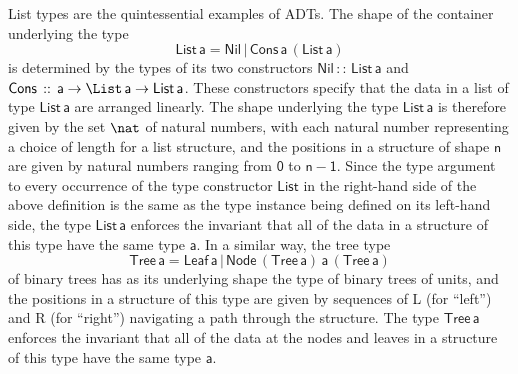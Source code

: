 \documentclass[submission,copyright,creativecommons]{eptcs}
\begin{document}
List types are the quintessential examples of ADTs. The shape of the
container underlying the
type
\[\mathsf{List\,a} = \mathsf{Nil} \,|\, \mathsf{Cons\,a\,(List\,a)}\]
is determined by the types of its two constructors $\mathsf{Nil\, ::\,
  List\, a}$ and $\mathsf{Cons \,::\,a \to \List\,a\to
  List\,a}$. These constructors specify that the data in a list of
type $\mathsf{List\,a}$ are arranged linearly. The shape underlying
the type $\mathsf{List\,a}$ is therefore given by the set $\nat$ of
natural numbers, with each natural number representing a choice of
length for a list structure, and the positions in a structure of shape
$\mathsf{n}$ are given by natural numbers ranging from $\mathsf{0}$ to
$\mathsf{n-1}$. Since the type argument to every occurrence of the
type constructor $\mathsf{List}$ in the right-hand side of the above
definition is the same as the type instance being defined on its
left-hand side, the type $\mathsf{List\,a}$ enforces the invariant
that all of the data in a structure of this type have the same type
$\mathsf{a}$. In a similar way, the tree type
\[\mathsf{Tree\, a} = \mathsf{Leaf\,a}
\,|\,\mathsf{Node\,(Tree\,a)\,a\,(Tree\,a)}\] of binary trees has as
its underlying shape the type of binary trees of units, and the
positions in a structure of this type are given by sequences of L (for
``left'') and R (for ``right'') navigating a path through the
structure. The type $\mathsf{Tree\, a}$ enforces the invariant that
all of the data at the nodes and leaves in a structure of this type
have the same type $\mathsf{a}$.
\end{document}
